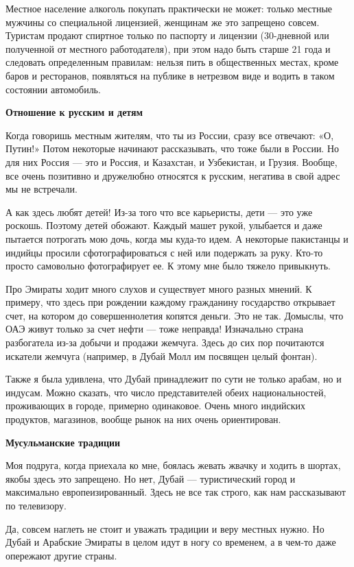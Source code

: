Местное население алкоголь покупать практически не может: только местные мужчины со специальной лицензией, женщинам же это запрещено совсем. Туристам продают спиртное только по паспорту и лицензии (30-дневной или полученной от местного работодателя), при этом надо быть старше 21 года и следовать определенным правилам: нельзя пить в общественных местах, кроме баров и ресторанов, появляться на публике в нетрезвом виде и водить в таком состоянии автомобиль.

\textbf{Отношение к русским и детям}

Когда говоришь местным жителям, что ты из России, сразу все отвечают: «О, Путин!» Потом некоторые начинают рассказывать, что тоже были в России. Но для них Россия — это и Россия, и Казахстан, и Узбекистан, и Грузия. Вообще, все очень позитивно и дружелюбно относятся к русским, негатива в свой адрес мы не встречали.

А как здесь любят детей! Из-за того что все карьеристы, дети — это уже роскошь. Поэтому детей обожают. Каждый машет рукой, улыбается и даже пытается потрогать мою дочь, когда мы куда-то идем. А некоторые пакистанцы и индийцы просили сфотографироваться с ней или подержать за руку. Кто-то просто самовольно фотографирует ее. К этому мне было тяжело привыкнуть.

Про Эмираты ходит много слухов и существует много разных мнений. К примеру, что здесь при рождении каждому гражданину государство открывает счет, на котором до совершеннолетия копятся деньги. Это не так. Домыслы, что ОАЭ живут только за счет нефти — тоже неправда! Изначально страна разбогатела из-за добычи и продажи жемчуга. Здесь до сих пор почитаются искатели жемчуга (например, в Дубай Молл им посвящен целый фонтан).

Также я была удивлена, что Дубай принадлежит по сути не только арабам, но и индусам. Можно сказать, что число представителей обеих национальностей, проживающих в городе, примерно одинаковое. Очень много индийских продуктов, магазинов, вообще рынок на них очень ориентирован.

\textbf{Мусульманские традиции}

Моя подруга, когда приехала ко мне, боялась жевать жвачку и ходить в шортах, якобы здесь это запрещено. Но нет, Дубай — туристический город и максимально европеизированный. Здесь не все так строго, как нам рассказывают по телевизору.

Да, совсем наглеть не стоит и уважать традиции и веру местных нужно. Но Дубай и Арабские Эмираты в целом идут в ногу со временем, а в чем-то даже опережают другие страны.

